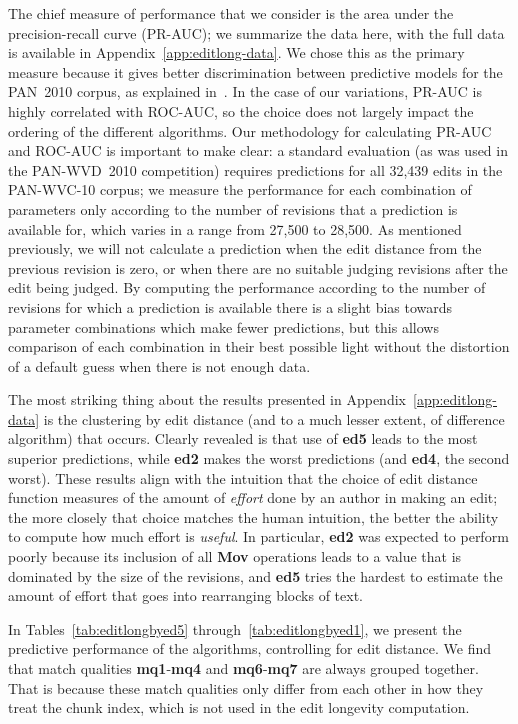 

The chief measure of performance that we consider is
the area under the precision-recall curve (PR-AUC);
we summarize the data here, with
the full data is available in Appendix~\ref{app:editlong-data}.
We chose this as the primary measure because it gives better
discrimination between predictive models for the PAN~2010
corpus, as explained in~\cite{Potthast2010b}.
In the case of our variations, PR-AUC is highly correlated
with ROC-AUC, so the choice does not largely impact the ordering
of the different algorithms.
Our methodology for calculating PR-AUC and ROC-AUC is important
to make clear: a standard evaluation (as was used in the
PAN-WVD~2010 competition) requires predictions for all 32,439
edits in the PAN-WVC-10 corpus; we measure the performance
for each combination of parameters only according to the number
of revisions that a prediction is available for, which varies
in a range from 27,500 to 28,500.
As mentioned previously, we will not calculate a prediction
when the edit distance from the previous revision is zero,
or when there are no suitable judging revisions after the
edit being judged.
By computing the performance according to the number of revisions
for which a prediction is available there is a slight bias towards
parameter combinations which make fewer predictions,
but this allows comparison of each combination in their best
possible light without the distortion of a default guess when
there is not enough data.

The most striking thing about the results presented
in Appendix~\ref{app:editlong-data} is the clustering
by edit distance (and to a much lesser extent, of difference
algorithm) that occurs.
Clearly revealed is that use of \textbf{ed5} leads to the most superior
predictions, while \textbf{ed2} makes the worst predictions
(and \textbf{ed4}, the second worst).
These results align with the intuition that the choice
of edit distance function measures of the amount
of \textit{effort} done by an author in making an edit;
the more closely that choice matches the human intuition,
the better the ability to compute how much effort is \textit{useful}.
In particular, \textbf{ed2} was expected to perform poorly
because its inclusion of all \textbf{Mov} operations leads
to a value that is dominated by the size of the revisions,
and \textbf{ed5} tries the hardest to estimate the amount of
effort that goes into rearranging blocks of text.

In Tables~\ref{tab:editlongbyed5} through~\ref{tab:editlongbyed1},
we present the predictive performance of the algorithms,
controlling for edit distance.
We find that match qualities \textbf{mq1}-\textbf{mq4}
and \textbf{mq6}-\textbf{mq7} are always grouped together.
That is because these match qualities only differ from each
other in how they treat the chunk index, which is not used in the
edit longevity computation.

